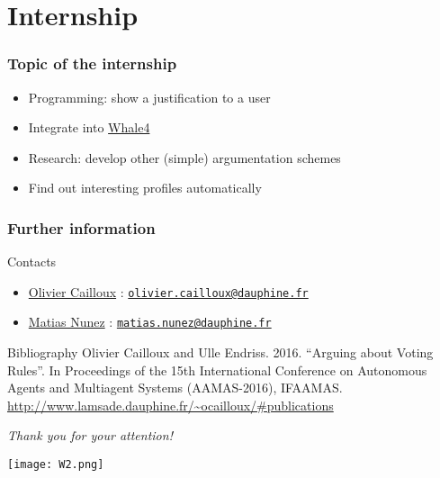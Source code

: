 \documentclass[english]{beamer}
\begin{document}
\section{Internship}
\begin{frame}
	\frametitle{Topic of the internship}
	
	\begin{itemize}
		\item Programming: show a justification to a user
		\item Integrate into \href{http://strokes.imag.fr/whale4/}{Whale4}
		\item Research: develop other (simple) argumentation schemes
		\item Find out interesting profiles automatically
	\end{itemize}
\end{frame}

\begin{frame}
	\frametitle{Further information}
	\begin{block}{Contacts}
		\begin{itemize}
			\item \href{https://www.ent.dauphine.fr/Annuaire/index.php?param0=fiche&param1=ocailloux}{Olivier Cailloux} : \href{mailto:olivier.cailloux@dauphine.fr}{\nolinkurl{olivier.cailloux@dauphine.fr}}
			\item \href{https://www.ent.dauphine.fr/Annuaire/index.php?param0=fiche&param1=manunez}{Matias Nunez} : \href{mailto:matias.nunez@dauphine.fr}{\nolinkurl{matias.nunez@dauphine.fr}}
		\end{itemize}
	\end{block}
	\begin{block}{Bibliography}
		Olivier Cailloux and Ulle Endriss. 2016. “Arguing about Voting Rules”. In Proceedings of the 15th International Conference on Autonomous Agents and Multiagent Systems (AAMAS-2016), IFAAMAS.
		\url{http://www.lamsade.dauphine.fr/~ocailloux/\#publications}
	\end{block}
\end{frame}

\begin{frame}[plain]
	\addtocounter{framenumber}{-1}
	\begin{center}
		\huge
		\textit{Thank you for your attention!}
	\end{center}
\end{frame}

\begin{frame}[plain]
	\addtocounter{framenumber}{-1}
	\begin{center}
		\texttt{[image: W2.png]}
	\end{center}
\end{frame}
\end{document}
